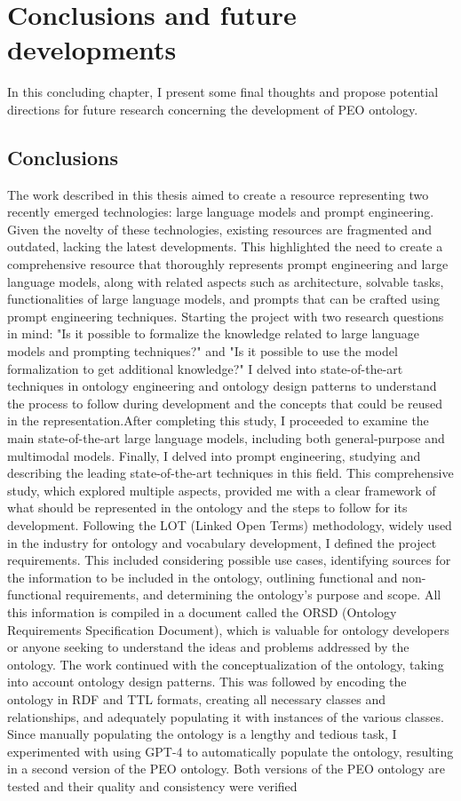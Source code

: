 \chapter{Conclusions and future developments}
In this concluding chapter, I present some final thoughts and propose potential directions for future research concerning the development of PEO ontology.


\section{Conclusions}
The work described in this thesis aimed to create a resource representing two recently emerged technologies: large language models and prompt engineering. Given the novelty of these technologies, existing resources are fragmented and outdated, lacking the latest developments. This highlighted the need to create a comprehensive resource that thoroughly represents prompt engineering and large language models, along with related aspects such as architecture, solvable tasks, functionalities of large language models, and prompts that can be crafted using prompt engineering techniques. Starting the project with two research questions in mind: "Is it possible to formalize the knowledge related to large language models and prompting techniques?" and "Is it possible to use the model formalization to get additional knowledge?" I delved into state-of-the-art techniques in ontology engineering and ontology design patterns to understand the process to follow during development and the concepts that could be reused in the representation.After completing this study, I proceeded to examine the main state-of-the-art large language models, including both general-purpose and multimodal models. Finally, I delved into prompt engineering, studying and describing the leading state-of-the-art techniques in this field. This comprehensive study, which explored multiple aspects, provided me with a clear framework of what should be represented in the ontology and the steps to follow for its development. Following the LOT (Linked Open Terms) methodology, widely used in the industry for ontology and vocabulary development, I defined the project requirements. This included considering possible use cases, identifying sources for the information to be included in the ontology, outlining functional and non-functional requirements, and determining the ontology's purpose and scope. All this information is compiled in a document called the ORSD (Ontology Requirements Specification Document), which is valuable for ontology developers or anyone seeking to understand the ideas and problems addressed by the ontology. The work continued with the conceptualization of the ontology, taking into account ontology design patterns. This was followed by encoding the ontology in RDF and TTL formats, creating all necessary classes and relationships, and adequately populating it with instances of the various classes. Since manually populating the ontology is a lengthy and tedious task, I experimented with using GPT-4 to automatically populate the ontology, resulting in a second version of the PEO ontology. Both versions of the PEO ontology are tested and their quality and consistency were verified 